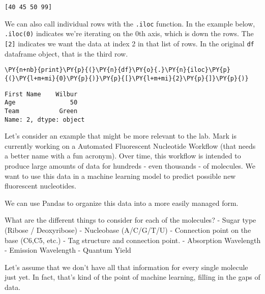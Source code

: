     \begin{Verbatim}[commandchars=\\\{\}]
[40 45 50 99]
    \end{Verbatim}

    We can also call individual rows with the \texttt{.iloc} function. In
the example below, \texttt{.iloc(0)} indicates we're iterating on the
0th axis, which is down the rows. The \texttt{{[}2{]}} indicates we want
the data at index 2 in that list of rows. In the original \texttt{df}
dataframe object, that is the third row.

    \begin{tcolorbox}[breakable, size=fbox, boxrule=1pt, pad at break*=1mm,colback=cellbackground, colframe=cellborder]
\begin{Verbatim}[commandchars=\\\{\}]
\PY{n+nb}{print}\PY{p}{(}\PY{n}{df}\PY{o}{.}\PY{n}{iloc}\PY{p}{(}\PY{l+m+mi}{0}\PY{p}{)}\PY{p}{[}\PY{l+m+mi}{2}\PY{p}{]}\PY{p}{)}
\end{Verbatim}
\end{tcolorbox}

    \begin{Verbatim}[commandchars=\\\{\}]
First Name    Wilbur
Age               50
Team           Green
Name: 2, dtype: object
    \end{Verbatim}

    Let's consider an example that might be more relevant to the lab. Mark
is currently working on a Automated Fluorescent Nucleotide Workflow
(that needs a better name with a fun acronym). Over time, this workflow
is intended to produce large amounts of data for hundreds - even
thousands - of molecules. We want to use this data in a machine learning
model to predict possible new fluorescent nucleotides.

We can use Pandas to organize this data into a more easily managed form.

What are the different things to consider for each of the molecules? -
Sugar type (Ribose / Deoxyribose) - Nucleobase (A/C/G/T/U) - Connection
point on the base (C6,C5, etc.) - Tag structure and connection point. -
Absorption Wavelength - Emission Wavelength - Quantum Yield

Let's assume that we don't have all that information for every single
molecule just yet. In fact, that's kind of the point of machine
learning, filling in the gaps of data.

